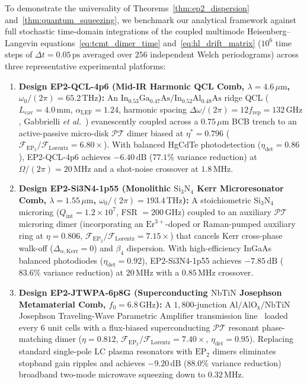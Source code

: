 \documentclass[11pt,letterpaper]{article}
\theoremstyle{definition}
\theoremstyle{remark}
\begin{document}
To demonstrate the universality of Theorems~\ref{thm:ep2_dispersion} and~\ref{thm:quantum_squeezing}, we benchmark our analytical framework against full stochastic time-domain integrations of the coupled multimode Heisenberg--Langevin equations~\eqref{eq:tcmt_dimer_time} and~\eqref{eq:hl_drift_matrix} ($10^6$ time steps of $\Delta t = 0.05\,\mathrm{ps}$ averaged over $256$ independent Welch periodograms) across three representative experimental platforms:
\begin{enumerate}
    \item \textbf{Design EP2-QCL-4p6 (Mid-IR Harmonic QCL Comb, $\lambda = 4.6\,\mu\mathrm{m}$, $\omega_0/(2\pi) = 65.2\,\mathrm{THz}$):} An $\mathrm{In}_{0.53}\mathrm{Ga}_{0.47}\mathrm{As}/\mathrm{In}_{0.52}\mathrm{Al}_{0.48}\mathrm{As}$ ridge QCL ($L_{\mathrm{cav}} = 4.0\,\mathrm{mm}$, $\alpha_{\mathrm{LEF}} = 1.24$, harmonic spacing $\Delta\omega/(2\pi) = 12 f_{\mathrm{rep}} = 132\,\mathrm{GHz}$, Gabbrielli \textit{et al.}~\cite{GabbrielliRoadmap2025}) evanescently coupled across a $0.75\,\mu\mathrm{m}$ BCB trench to an active-passive micro-disk $\mathcal{PT}$ dimer biased at $\eta^* = 0.796$ ($\mathcal{F}_{\mathrm{EP}_2}/\mathcal{F}_{\mathrm{Lorentz}} = 6.80\times$). With balanced HgCdTe photodetection ($\eta_{\mathrm{det}} = 0.86$), EP2-QCL-4p6 achieves $-6.40\,\mathrm{dB}$ ($77.1\%$ variance reduction) at $\Omega/(2\pi) = 20\,\mathrm{MHz}$ and a shot-noise crossover at $1.8\,\mathrm{MHz}$.
    \item \textbf{Design EP2-Si3N4-1p55 (Monolithic $\mathrm{Si_3N_4}$ Kerr Microresonator Comb, $\lambda = 1.55\,\mu\mathrm{m}$, $\omega_0/(2\pi) = 193.4\,\mathrm{THz}$):} A stoichiometric $\mathrm{Si_3N_4}$ microring ($Q_{\mathrm{int}} = 1.2\times 10^7$, FSR $= 200\,\mathrm{GHz}$) coupled to an auxiliary $\mathcal{PT}$ microring dimer (incorporating an $\mathrm{Er}^{3+}$-doped or Raman-pumped auxiliary ring at $\eta = 0.806$, $\mathcal{F}_{\mathrm{EP}_2}/\mathcal{F}_{\mathrm{Lorentz}} = 7.15\times$) that cancels Kerr cross-phase walk-off ($\Delta_{\alpha,\mathrm{Kerr}} = 0$) and $\beta_4$ dispersion. With high-efficiency InGaAs balanced photodiodes ($\eta_{\mathrm{det}} = 0.92$), EP2-Si3N4-1p55 achieves $-7.85\,\mathrm{dB}$ ($83.6\%$ variance reduction) at $20\,\mathrm{MHz}$ with a $0.85\,\mathrm{MHz}$ crossover.
    \item \textbf{Design EP2-JTWPA-6p8G (Superconducting $\mathrm{NbTiN}$ Josephson Metamaterial Comb, $f_0 = 6.8\,\mathrm{GHz}$):} A $1{,}800$-junction $\mathrm{Al/AlO_x/NbTiN}$ Josephson Traveling-Wave Parametric Amplifier transmission line~\cite{Macklin2015,Planat2020} loaded every $6$ unit cells with a flux-biased superconducting $\mathcal{PT}$ resonant phase-matching dimer ($\eta = 0.812$, $\mathcal{F}_{\mathrm{EP}_2}/\mathcal{F}_{\mathrm{Lorentz}} = 7.40\times$, $\eta_{\mathrm{det}} = 0.95$). Replacing standard single-pole LC plasma resonators with $\mathrm{EP}_2$ dimers eliminates stopband gain ripples and achieves $-9.20\,\mathrm{dB}$ ($88.0\%$ variance reduction) broadband two-mode microwave squeezing down to $0.32\,\mathrm{MHz}$.
\end{enumerate}
\end{document}
